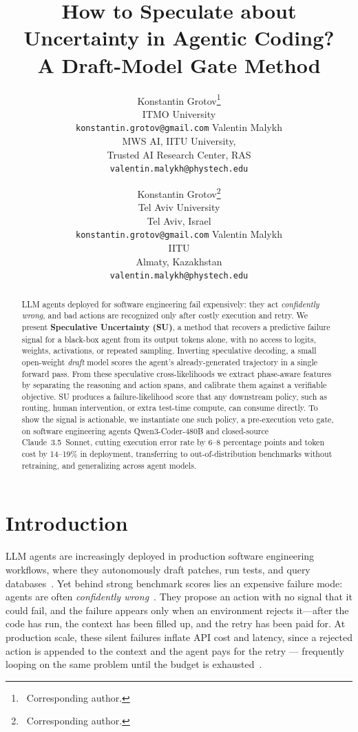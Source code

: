 \documentclass[11pt]{article}
\title{How to Speculate about Uncertainty in Agentic Coding?\\A Draft-Model Gate Method}
\author{
  Konstantin Grotov\thanks{\ Corresponding author.} \\
  ITMO University \\
  \texttt{konstantin.grotov@gmail.com}
  \And
  Valentin Malykh \\
  MWS AI, IITU University, \\
  Trusted AI Research Center, RAS \\
  \texttt{valentin.malykh@phystech.edu}
}
\author{
  Konstantin Grotov\thanks{\ Corresponding author.} \\
  Tel Aviv University \\
  Tel Aviv, Israel \\
  \texttt{konstantin.grotov@gmail.com}
  \And
  Valentin Malykh \\
  IITU \\
  Almaty, Kazakhstan \\
  \texttt{valentin.malykh@phystech.edu}
}
\newcommand{\Hnumber}[1]{#1}
\begin{document}
\maketitle

\begin{abstract}
LLM agents deployed for software engineering fail expensively: they act
\emph{confidently wrong}, and bad actions are recognized only after costly
execution and retry. We present \textbf{Speculative Uncertainty (SU)}, a
method that recovers a predictive failure signal for a black-box
agent from its output tokens alone, with no access to logits, weights,
activations, or repeated sampling. Inverting speculative decoding, a small open-weight
\emph{draft} model scores the agent's already-generated trajectory in a single
forward pass. From these speculative cross-likelihoods we extract phase-aware
features by separating the reasoning and action spans, and calibrate them against
a verifiable objective. SU produces a failure-likelihood score that any downstream policy, such as routing, human intervention, or extra test-time compute, can consume directly.
To show the signal is actionable, we instantiate one such policy, a
pre-execution veto gate, on software engineering agents Qwen3-Coder-480B and
closed-source Claude~3.5~Sonnet, cutting execution error rate by
\Hnumber{6--8} percentage points and token cost by \Hnumber{14--19}\% in deployment, transferring
to out-of-distribution benchmarks without retraining, and generalizing across
agent models.
\end{abstract}

\section{Introduction}
\label{sec:intro}

LLM agents are increasingly deployed in production software engineering
workflows, where they autonomously draft patches, run tests, and query databases~\citep{jimenez2024swebench, badertdinov2026swe, swesmith}.
Yet behind strong benchmark scores lies an expensive failure mode: agents are
often \emph{confidently wrong}~\citep{agentic_overconfidence}. They propose an action with no signal that it could
fail, and the failure appears only when an environment rejects it---after
the code has run, the context has been filled up, and the retry has been paid for. At production scale, these silent failures inflate API cost and latency, since a rejected action is appended to the context and the agent pays for the retry — frequently looping on the same problem until the budget is exhausted~\citep{agentic_overconfidence}.
\end{document}
